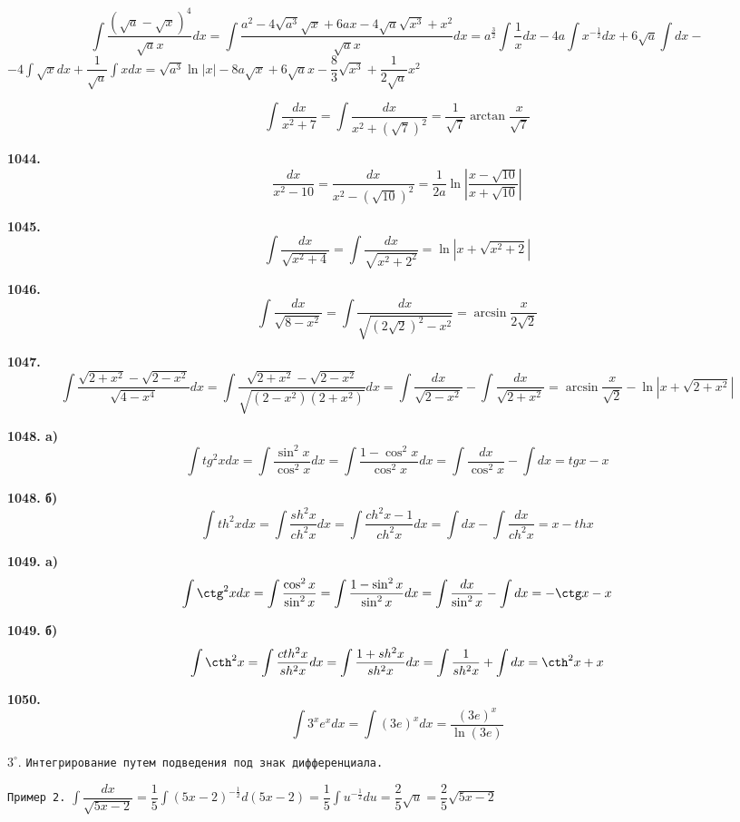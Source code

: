 \documentclass[12pt]{article}
\begin{document}
	\vspace{3mm}{\bf 1042.}\[
		\int \dfrac{(\sqrt{a}-\sqrt{x})^4}{\sqrt{a}x}dx = \int \dfrac{a^2-4\sqrt{a^3}\sqrt{x}+6ax-4\sqrt{a}\sqrt{x^3}+x^2}{\sqrt{a}x}dx = a^\frac{3}{2}\int \dfrac{1}{x}dx - 4a\int x^{-\frac{1}{2}} dx + 6\sqrt{a}\int dx -
	\]
	\quad$-4\int \sqrt{x}dx + \dfrac{1}{\sqrt{a}}\int xdx = \sqrt{a^3}\ln|x| - 8a\sqrt{x} +6\sqrt{a}x - \dfrac{8}{3}\sqrt{x^3} +\dfrac{1}{2\sqrt{a}}x^2$
	
	\vspace{3mm}{\bf 1043.}\[
		\int \dfrac{dx}{x^2+7} = \int \dfrac{dx}{x^2+(\sqrt{7})^2}  = \dfrac{1}{\sqrt{7}}\arctan\dfrac{x}{\sqrt{7}}
	\]
	
	{\bf 1044.} \[
		\dfrac{dx}{x^2-10} = \dfrac{dx}{x^2-(\sqrt{10})^2} = \dfrac{1}{2a}\ln\left|\dfrac{x-\sqrt{10}}{x+\sqrt{10}}\right|
	\]
	
	{\bf 1045.} \[
		\int\dfrac{dx}{\sqrt{x^2+4}} = \int\dfrac{dx}{\sqrt{x^2+2^2}} = \ln|x+\sqrt{x^2+2}|
	\]
	
	{\bf 1046.} \[
		\int\dfrac{dx}{\sqrt{8-x^2}} = \int\dfrac{dx}{\sqrt{(2\sqrt{2})^2-x^2}} = \arcsin\dfrac{x}{2\sqrt{2}}
	\]
	
	{\bf 1047.}\[
		\int \dfrac{\sqrt{2+x^2}-\sqrt{2-x^2}}{\sqrt{4-x^4}}dx = \int\dfrac{\sqrt{2+x^2}-\sqrt{2-x^2}}{\sqrt{(2-x^2)(2+x^2)}}dx = \int \dfrac{dx}{\sqrt{2-x^2}} - \int\dfrac{dx}{\sqrt{2+x^2}} = \arcsin\dfrac{x}{\sqrt{2}} - \ln|x+\sqrt{2+x^2}|
	\]
	
	{\bf 1048. a)} \[
		\int tg^2 xdx = \int \dfrac{\sin^2 x}{\cos^2 x}dx = \int\dfrac{1-\cos^2 x}{\cos^2 x}dx = \int \dfrac{dx}{\cos^2 x} - \int dx = tg x-x
	\]
	
	{\bf 1048. б)} \[
		\int th^2 x dx = \int\dfrac{sh^2 x}{ch^2 x}dx = \int \dfrac{ch^2 x-1}{ch^2 x}dx = \int dx - \int \dfrac{dx}{ch^2 x} = x -th x
	\]
	
	{\bf 1049. a)}\[
		\int \ctg^2 xdx = \int \dfrac{\cos^2 x}{\sin^2 x} = \int\dfrac{1-\sin^2 x}{\sin^2 x}dx = \int\dfrac{dx}{\sin^2 x} - \int dx = -\ctg x - x
	\]
	
	{\bf 1049. б)} \[
		\int \cth^2 x = \int\dfrac{cth^2 x}{sh^2 x}dx = \int\dfrac{1+sh^2 x}{sh^2 x}dx = \int \dfrac{1}{sh^2 x} + \int dx = \cth^2 x + x
	\]
	
	{\bf 1050.} \[
		\int 3^x e^x dx = \int (3e)^x dx = \dfrac{(3e)^x}{\ln (3e)}
	\]
	
	$3^{\circ}.$ {\tt Интегрирование путем подведения под знак дифференциала.} \medskip
	
	{\tt Пример 2.} $\displaystyle\int \dfrac{dx}{\sqrt{5x-2}} = \dfrac{1}{5}\int (5x-2)^{-\frac{1}{2}}d(5x-2) = 
	\dfrac{1}{5}\int u^{-\frac{1}{2}}du = \dfrac{2}{5}\sqrt{u} = \dfrac{2}{5} \sqrt{5x-2}$\vspace{2mm}
	
\end{document}

